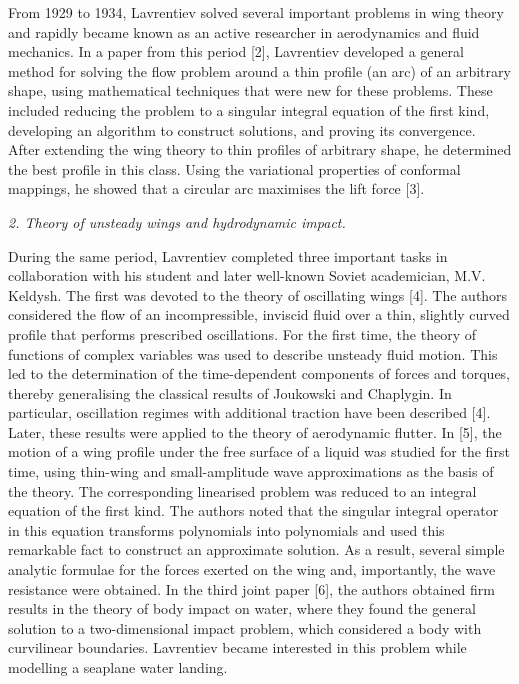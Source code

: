 \documentclass[%
 reprint,
onecolumn,
 amsmath,amssymb, aps,
]{revtex4-2}
\numberwithin{equation}{section}
\begin{document}
 From 1929 to 1934,  Lavrentiev solved several important problems in wing theory and rapidly became known as an active researcher in aerodynamics and fluid mechanics.
 In a paper from this period [2], Lavrentiev developed a general method for solving the flow problem around a thin profile (an arc) of an arbitrary shape,
using mathematical techniques that were new for these problems.
These included reducing the problem to a singular integral equation of the first kind, developing an algorithm to construct solutions, and proving its convergence.
After extending the wing theory to thin profiles of arbitrary shape, he determined the best profile in this class.
Using the variational properties of conformal mappings, he showed that a circular arc maximises the lift force [3].
\vspace{3mm}

\textit{2. Theory of unsteady wings and hydrodynamic impact.}
\vspace{1mm}

During the same period, Lavrentiev completed three important tasks in collaboration with his student and later well-known Soviet academician, M.V. Keldysh.
The first was devoted to the theory of oscillating wings [4].
The authors considered the flow of an incompressible, inviscid fluid over a thin, slightly curved profile that performs prescribed oscillations.
For the first time, the theory of functions of complex variables was used to describe unsteady fluid motion.
This led to the determination of the time-dependent components of forces and torques, thereby generalising the classical results of Joukowski and Chaplygin.
In particular, oscillation regimes with additional traction have been described [4].
Later, these results were applied to the theory of aerodynamic flutter.
In [5], the motion of a wing profile under the free surface of a liquid was studied for the first time, using
 thin-wing and small-amplitude wave approximations as the basis of the theory.
The corresponding linearised problem was reduced to an integral equation of the first kind.
The authors noted that the singular integral operator in this equation transforms polynomials into polynomials and used this remarkable fact to construct an approximate solution.
As a result, several simple analytic formulae for the forces exerted on the wing and, importantly, the wave resistance were obtained.
In the third joint paper [6], the authors obtained firm results in the theory of body impact on water,
where they found the general solution to a two-dimensional impact problem, which
 considered a body with curvilinear boundaries.
Lavrentiev became interested in this problem while modelling a seaplane water landing.
\vspace{3mm}
\end{document}
